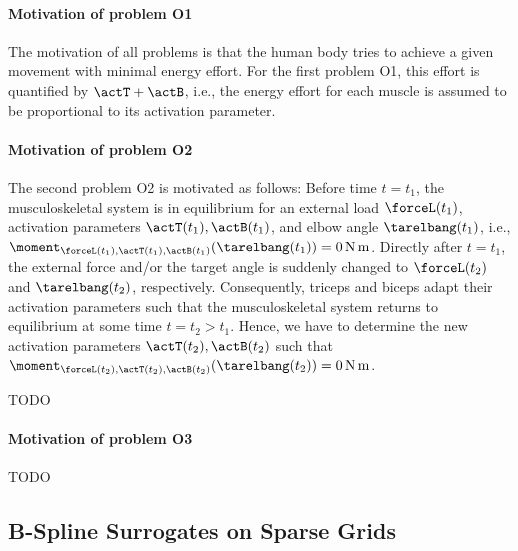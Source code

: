 \paragraph{Motivation of problem O1}

The motivation of all problems is that the human body tries to
achieve a given movement with minimal energy effort.
For the first problem O1, this effort is quantified by $\actT + \actB$,
i.e., the energy effort for each muscle is assumed to be proportional
to its activation parameter.

\paragraph{Motivation of problem O2}

The second problem O2 is motivated as follows:
Before time $t = t_1$, the musculoskeletal system is in equilibrium for
an external load $\forceL(t_1)$,
activation parameters $\actT(t_1), \actB(t_1)$, and
elbow angle $\tarelbang(t_1)$, i.e.,
$\moment_{\forceL(t_1),\actT(t_1),\actB(t_1)}(\tarelbang(t_1))
= \SI{0}{\newton\meter}$.
Directly after $t = t_1$,
the external force and/or the target angle is suddenly changed
to $\forceL(t_2)$ and $\tarelbang(t_2)$, respectively.
Consequently, triceps and biceps adapt their activation parameters
such that the musculoskeletal system returns to equilibrium
at some time $t = t_2 > t_1$.
Hence, we have to determine the new activation parameters
$\actT(t_2), \actB(t_2)$ such that
$\moment_{\forceL(t_2),\actT(t_2),\actB(t_2)}(\tarelbang(t_2))
= \SI{0}{\newton\meter}$.

TODO

\paragraph{Motivation of problem O3}

TODO



\subsection{B-Spline Surrogates on Sparse Grids}
\label{sec:723surrogates}


\dummytext[3]{}
